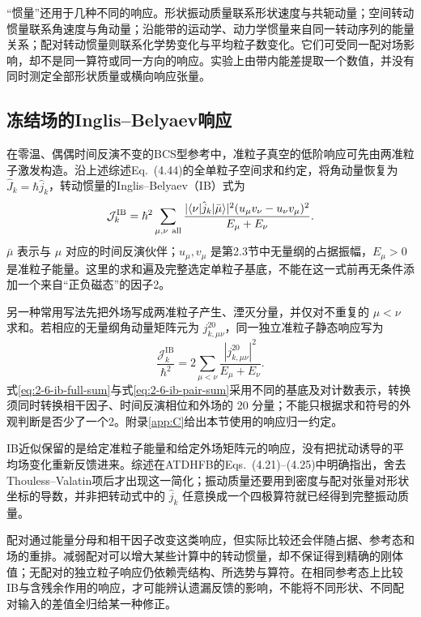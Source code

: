 “惯量”还用于几种不同的响应。形状振动质量联系形状速度与共轭动量；空间转动惯量联系角速度与角动量；沿能带的运动学、动力学惯量来自同一转动序列的能量关系；配对转动惯量则联系化学势变化与平均粒子数变化。它们可受同一配对场影响，却不是同一算符或同一方向的响应。实验上由带内能差提取一个数值，并没有同时测定全部形状质量或横向响应张量。

\subsection{冻结场的Inglis--Belyaev响应}\label{sec:2-6-3}

在零温、偶偶时间反演不变的BCS型参考中，准粒子真空的低阶响应可先由两准粒子激发构造。沿上述综述Eq.~(4.44)的全单粒子空间求和约定，将角动量恢复为 \(\hat J_k=\hbar\hat j_k\)，转动惯量的Inglis--Belyaev（IB）式为
\begin{equation}\label{eq:2-6-ib-full-sum}
\mathcal J_k^{\mathrm{IB}}
=\hbar^2\sum_{\mu,\nu\ {\rm all}}
\frac{|\langle\nu|\hat j_k|\bar\mu\rangle|^2
(u_\mu v_\nu-u_\nu v_\mu)^2}
{E_\mu+E_\nu}.
\end{equation}
\(\bar\mu\) 表示与 \(\mu\) 对应的时间反演伙伴；\(u_\mu,v_\mu\) 是第2.3节中无量纲的占据振幅，\(E_\mu>0\) 是准粒子能量。这里的求和遍及完整选定单粒子基底，不能在这一式前再无条件添加一个来自“正负磁态”的因子2。\cite[PDF~p.~34, Eq.~(4.44)]{prochniak-rohozinski-2009-bohr-collective-hamiltonian}

另一种常用写法先把外场写成两准粒子产生、湮灭分量，并仅对不重复的 \(\mu<\nu\) 求和。若相应的无量纲角动量矩阵元为 \(j^{20}_{k,\mu\nu}\)，同一独立准粒子静态响应写为
\begin{equation}\label{eq:2-6-ib-pair-sum}
\frac{\mathcal J_k^{\mathrm{IB}}}{\hbar^2}
=2\sum_{\mu<\nu}
\frac{|j^{20}_{k,\mu\nu}|^2}{E_\mu+E_\nu}.
\end{equation}
式\eqref{eq:2-6-ib-full-sum}与式\eqref{eq:2-6-ib-pair-sum}采用不同的基底及对计数表示，转换须同时转换相干因子、时间反演相位和外场的 \(20\) 分量；不能只根据求和符号的外观判断是否少了一个2。附录\ref{app:C}给出本节使用的响应归一约定。

IB近似保留的是给定准粒子能量和给定外场矩阵元的响应，没有把扰动诱导的平均场变化重新反馈进来。综述在ATDHFB的Eqs.~(4.21)--(4.25)中明确指出，舍去Thouless--Valatin项后才出现这一简化；振动质量还要用到密度与配对张量对形状坐标的导数，并非把转动式中的 \(\hat j_k\) 任意换成一个四极算符就已经得到完整振动质量。\cite[Eqs.~(4.21)--(4.25), (4.44)]{prochniak-rohozinski-2009-bohr-collective-hamiltonian}

配对通过能量分母和相干因子改变这类响应，但实际比较还会伴随占据、参考态和场的重排。减弱配对可以增大某些计算中的转动惯量，却不保证得到精确的刚体值；无配对的独立粒子响应仍依赖壳结构、所选势与算符。在相同参考态上比较IB与含残余作用的响应，才可能辨认遗漏反馈的影响，不能将不同形状、不同配对输入的差值全归给某一种修正。\cite{petrik-kortelainen-2018-rotational-tv-inertia}

